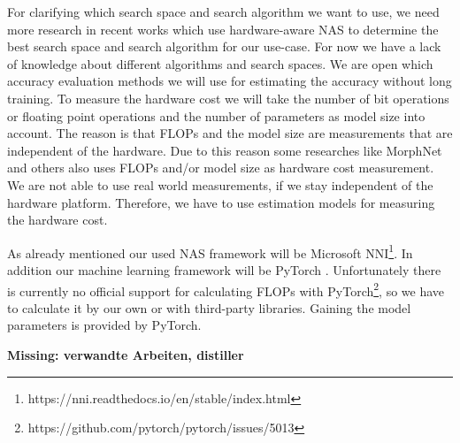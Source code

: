 \documentclass[conference]{IEEEtran}
\begin{document}
For clarifying which search space and search algorithm we want to use, we need more research in recent works which use hardware-aware NAS to determine the best search space and search algorithm for our use-case. For now we have a lack of knowledge about different algorithms and search spaces. We are open which accuracy evaluation methods we will use for estimating the accuracy without long training. To measure the hardware cost we will take the number of bit operations or floating point operations and the number of parameters as model size into account. The reason is that FLOPs and the model size are measurements that are independent of the hardware. Due to this reason some researches like MorphNet \cite{bib10} and others also uses FLOPs \cite{bib5}\cite{bib11}\cite{bib13} and/or model size \cite{bib12} as hardware cost measurement. We are not able to use real world measurements, if we stay independent of the hardware platform. Therefore, we have to use estimation models for measuring the hardware cost. 

As already mentioned our used NAS framework will be Microsoft NNI\footnote{https://nni.readthedocs.io/en/stable/index.html}. In addition our machine learning framework will be PyTorch \cite{bib4}. Unfortunately there is currently no official support for calculating FLOPs with PyTorch\footnote{https://github.com/pytorch/pytorch/issues/5013}, so we have to calculate it by our own or with third-party libraries. Gaining the model parameters is provided by PyTorch.

\textbf{Missing: verwandte Arbeiten, distiller}
\end{document}
